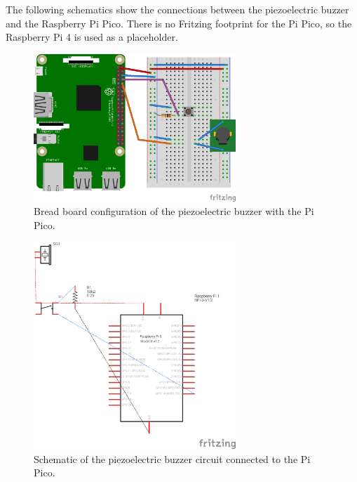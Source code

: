 The following schematics show the connections between the piezoelectric buzzer and the Raspberry Pi Pico. There is no
Fritzing footprint for the Pi Pico, so the Raspberry Pi 4 is used as a placeholder.

\begin{figure}[H]
    \centering
    \includegraphics[width=3in]{../assets/AudiohatBB.png}
    \caption{Bread board configuration of the piezoelectric buzzer with the Pi Pico.}
\end{figure}

\begin{figure}[H]
    \centering
    \includegraphics[width=3in]{../assets/AudiohatSchema.png}
    \caption{Schematic of the piezoelectric buzzer circuit connected to the Pi Pico.}
\end{figure}
